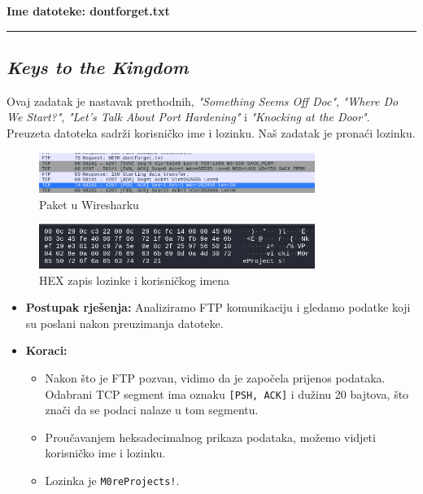 \documentclass{article}
\begin{document}
\begin{center}
    \textbf{Ime datoteke: dontforget.txt}
\end{center}

\noindent\rule{\textwidth}{0.4pt}


\subsection{\textit{Keys to the Kingdom}}
\begin{tcolorbox}[
    colback=gray!5,  %
    colframe=gray!75,  %
    title=\textbf{Zadatak}]
    Ovaj zadatak je nastavak prethodnih, \textit{"Something Seems Off Doc"}, \textit{"Where Do We Start?"}, \textit{"Let's Talk About Port Hardening"} i \textit{"Knocking at the Door"}. Preuzeta datoteka sadrži korisničko ime i lozinku. Naš zadatak je pronaći lozinku.
\end{tcolorbox}

\begin{figure}[h]
    \centering
    \includegraphics[width=0.8\textwidth]{KeysToKingdom0.png}
    \caption{Paket u Wiresharku}
    \label{fig:pckt_wireshark}
\end{figure}

\begin{figure}[h]
    \centering
    \includegraphics[width=0.8\textwidth]{KeysToKingdom.png}
    \caption{HEX zapis lozinke i korisničkog imena}
    \label{fig:flag_wireshark_Kingdom}
\end{figure}

\begin{itemize}
    \item \textbf{Postupak rješenja:} Analiziramo FTP komunikaciju i gledamo podatke koji su poslani nakon preuzimanja datoteke.
    \item \textbf{Koraci:}
    \begin{itemize}
        \item Nakon što je FTP pozvan, vidimo da je započela prijenos podataka. Odabrani TCP segment ima oznaku \texttt{[PSH, ACK]} i dužinu 20 bajtova, što znači da se podaci nalaze u tom segmentu.
        \item Proučavanjem heksadecimalnog prikaza podataka, možemo vidjeti korisničko ime i lozinku.
        \item Lozinka je \texttt{M0reProjects!}.
    \end{itemize}
\end{itemize}
\end{document}
